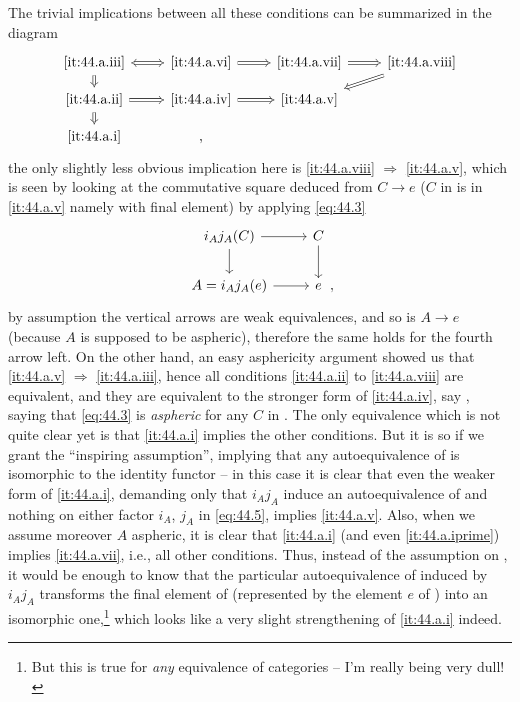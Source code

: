 The trivial implications between all these conditions can be
summarized in the diagram
\[\begin{tikzcd}[baseline=(O.base),math mode=false,%
  row sep=small,arrows=Rightarrow]
  \ref{it:44.a.iii} \ar[r,Leftrightarrow]\ar[d] & \ref{it:44.a.vi} \ar[r] &
  \ref{it:44.a.vii} \ar[r] & \ref{it:44.a.viii} \ar[dl] \\
  \ref{it:44.a.ii} \ar[r]\ar[d] & \ref{it:44.a.iv} \ar[r] &
  \ref{it:44.a.v} & \\
  |[alias=O]| \ref{it:44.a.i} & , & &
\end{tikzcd}\]
the only slightly less obvious implication here is \ref{it:44.a.viii}
$\Rightarrow$ \ref{it:44.a.v}, which is seen by looking at the
commutative square deduced from $C\to e$ ($C$ in \Cat{} is in
\ref{it:44.a.v} namely with final element) by applying
\eqref{eq:44.3}
\[\begin{tikzcd}[baseline=(O.base)]
  i_Aj_A(C)\ar[d]\ar[r] & C\ar[d] \\
  A=i_Aj_A(e)\ar[r] & |[alias=O]| e
\end{tikzcd},\]
by assumption the vertical arrows are weak equivalences, and so is
$A\to e$ (because $A$ is supposed to be aspheric), therefore the same
holds for the fourth arrow left. On the other hand, an easy
asphericity argument showed us that \ref{it:44.a.v} $\Rightarrow$
\ref{it:44.a.iii}, hence all conditions \ref{it:44.a.ii} to
\ref{it:44.a.viii} are equivalent, and they are equivalent to the
stronger form of \ref{it:44.a.iv}, say
, saying that \eqref{eq:44.3} is
\emph{aspheric} for any $C$ in \Cat. The only equivalence which is not
quite clear yet is that \ref{it:44.a.i} implies the other
conditions. But it is so if we grant the ``inspiring
assumption'', implying that any autoequivalence of \Hot{} is
isomorphic to the identity functor -- in this case it is clear that
even the weaker form  of \ref{it:44.a.i},
demanding only that $i_Aj_A$ induce an autoequivalence of \Hot{} and
nothing on either factor $i_A$, $j_A$ in \eqref{eq:44.5}, implies
\ref{it:44.a.v}. Also, when we assume moreover $A$ aspheric, it is
clear that \ref{it:44.a.i} (and even \ref{it:44.a.iprime}) implies
\ref{it:44.a.vii}, i.e., all other conditions. Thus, instead of the
assumption on \Hot, it would be enough to know that the particular
autoequivalence of \Hot{} induced by $i_Aj_A$ transforms the final
element of \Hot{} (represented by the element $e$ of \Cat) into an
isomorphic one,\footnote{ But this is true for \emph{any}
  equivalence of categories -- I'm really being very dull!} which
looks like a very slight strengthening of \ref{it:44.a.i} indeed.

